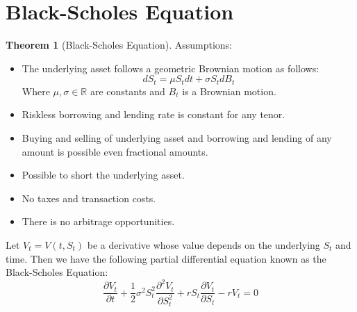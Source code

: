 \documentclass[11pt]{article}
\theoremstyle{definition}
\newtheorem{thm}[prop]{Theorem}
\newcommand{\brac}[1]{\left(#1\right)}
\newcommand{\pardiff}[2]{\frac{\partial #1}{\partial #2}}
\newcommand{\R}{\mathbb{R}}
\begin{document}
\section{Black-Scholes Equation}
	\begin{thm}[Black-Scholes Equation]\label{BSEDeriv}
		Assumptions:
		\begin{itemize}
			\item The underlying asset follows a geometric Brownian motion as follows:
			$$ dS_t = \mu S_t dt + \sigma S_t dB_t$$
			Where $\mu,\sigma\in\R$ are constants and $B_t$ is a Brownian motion.
			\item Riskless borrowing and lending rate is constant for any tenor.
			\item Buying and selling of underlying asset and borrowing and lending of any amount is possible even fractional amounts.
			\item Possible to short the underlying asset.
			\item No taxes and transaction costs.
			\item There is no arbitrage opportunities.
		\end{itemize}
		Let $V_t = V\brac{t,S_t}$ be a derivative whose value depends on the underlying $S_t$ and time. Then we have the following partial differential equation known as the Black-Scholes Equation:
		\begin{equation}\label{BSE}
			\pardiff{V_t}{t} + \frac{1}{2}\sigma^2S^2_t\pardiff{^2V_t}{S_t^2} + rS_t\pardiff{V_t}{S_t} - rV_t = 0
		\end{equation}
	\end{thm}
\end{document}
